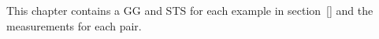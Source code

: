 This chapter contains a GG and STS for each example in section~\ref{} and the measurements for each pair.
